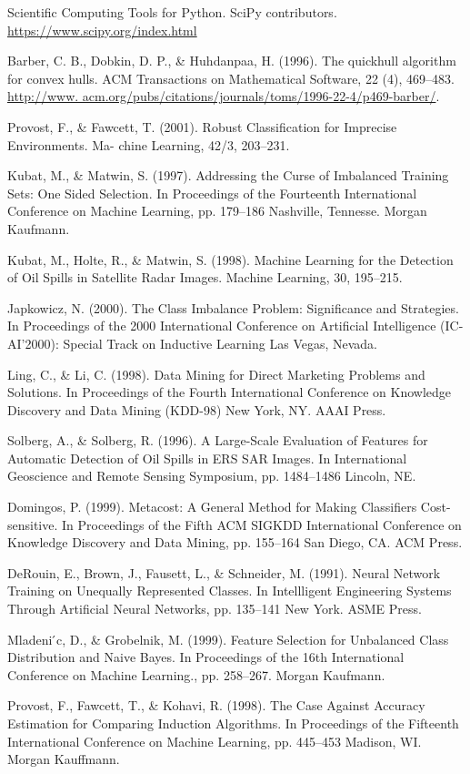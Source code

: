 \documentclass[10pt,journal,compsoc]{IEEEtran}
\begin{document}
\begin{thebibliography}{10}
Scientific Computing Tools for Python. SciPy contributors.
\url{https://www.scipy.org/index.html}
 
Barber, C. B., Dobkin, D. P., \& Huhdanpaa, H. (1996). The quickhull algorithm for convex hulls. ACM Transactions on Mathematical Software, 22 (4), 469–483. 
\url{http://www. acm.org/pubs/citations/journals/toms/1996-22-4/p469-barber/}.

Provost, F., \& Fawcett, T. (2001). Robust Classification for Imprecise Environments. Ma- chine Learning, 42/3, 203–231.

Kubat, M., \& Matwin, S. (1997). Addressing the Curse of Imbalanced Training Sets: One Sided Selection. In Proceedings of the Fourteenth International Conference on Machine Learning, pp. 179–186 Nashville, Tennesse. Morgan Kaufmann.

Kubat, M., Holte, R., \& Matwin, S. (1998). Machine Learning for the Detection of Oil Spills in Satellite Radar Images. Machine Learning, 30, 195–215.

Japkowicz, N. (2000). The Class Imbalance Problem: Significance and Strategies. In Proceedings of the 2000 International Conference on Artificial Intelligence (IC-AI’2000): Special Track on Inductive Learning Las Vegas, Nevada.

Ling, C., \& Li, C. (1998). Data Mining for Direct Marketing Problems and Solutions. In
Proceedings of the Fourth International Conference on Knowledge Discovery and Data Mining (KDD-98) New York, NY. AAAI Press.

Solberg, A., \& Solberg, R. (1996). A Large-Scale Evaluation of Features for Automatic Detection of Oil Spills in ERS SAR Images. In International Geoscience and Remote Sensing Symposium, pp. 1484–1486 Lincoln, NE.

Domingos, P. (1999). Metacost: A General Method for Making Classifiers Cost-sensitive. In Proceedings of the Fifth ACM SIGKDD International Conference on Knowledge Discovery and Data Mining, pp. 155–164 San Diego, CA. ACM Press.

DeRouin, E., Brown, J., Fausett, L., \& Schneider, M. (1991). Neural Network Training on Unequally Represented Classes. In Intellligent Engineering Systems Through Artificial Neural Networks, pp. 135–141 New York. ASME Press.

Mladeni ́c, D., \& Grobelnik, M. (1999). Feature Selection for Unbalanced Class Distribution and Naive Bayes. In Proceedings of the 16th International Conference on Machine Learning., pp. 258–267. Morgan Kaufmann.

Provost, F., Fawcett, T., \& Kohavi, R. (1998). The Case Against Accuracy Estimation for Comparing Induction Algorithms. In Proceedings of the Fifteenth International Conference on Machine Learning, pp. 445–453 Madison, WI. Morgan Kauffmann.

\end{thebibliography}
\end{document}
